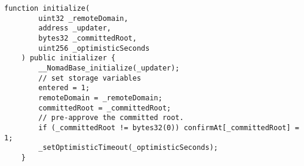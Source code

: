 \begin{lstlisting}[caption={Fonction corrigée de l'application \textit{Réplica} \cite{NomadGitFixed}}]
    function initialize(
        uint32 _remoteDomain,
        address _updater,
        bytes32 _committedRoot,
        uint256 _optimisticSeconds
    ) public initializer {
        __NomadBase_initialize(_updater);
        // set storage variables
        entered = 1;
        remoteDomain = _remoteDomain;
        committedRoot = _committedRoot;
        // pre-approve the committed root.
        if (_committedRoot != bytes32(0)) confirmAt[_committedRoot] = 1;
        _setOptimisticTimeout(_optimisticSeconds);
    }
\end{lstlisting}



